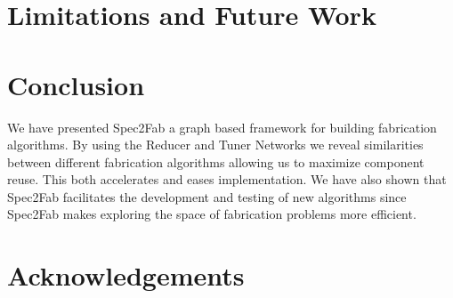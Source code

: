 \documentclass[annual]{acmsiggraph}
\begin{document}
\section{Limitations and Future Work}


\section{Conclusion}
We have presented Spec2Fab a graph based framework for building fabrication algorithms. By using the Reducer and Tuner Networks we reveal similarities between different fabrication algorithms allowing us to maximize component reuse. This both accelerates and eases implementation. We have also shown that Spec2Fab facilitates the development and testing of new algorithms since Spec2Fab makes exploring the space of fabrication problems more efficient.
\section*{Acknowledgements}



\end{document}
